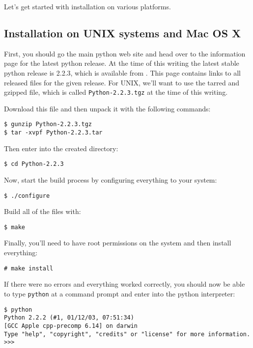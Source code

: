 \documentclass{article}
\begin{document}
Let's get started with installation on various platforms.

\subsection{Installation on UNIX systems and Mac OS X}

First, you should go the main python web site and head over to the information
page for the latest python release. At the time of this writing the
latest stable python release is 2.2.3, which is available from
. This page contains links
to all released files for the given release. For UNIX, we'll want to use
the tarred and gzipped file, which is called \verb|Python-2.2.3.tgz| at
the time of this writing.

Download this file and then unpack it with the following commands:

\begin{verbatim}
$ gunzip Python-2.2.3.tgz 
$ tar -xvpf Python-2.2.3.tar 
\end{verbatim}

Then enter into the created directory:

\begin{verbatim}
$ cd Python-2.2.3
\end{verbatim}

Now, start the build process by configuring everything to your system:

\begin{verbatim}
$ ./configure
\end{verbatim}

Build all of the files with:

\begin{verbatim}
$ make
\end{verbatim}

Finally, you'll need to have root permissions on the system and then
install everything:

\begin{verbatim}
# make install
\end{verbatim}

If there were no errors and everything worked correctly, you should now
be able to type \verb|python| at a command prompt and enter into the
python interpreter:

\begin{verbatim}
$ python
Python 2.2.2 (#1, 01/12/03, 07:51:34) 
[GCC Apple cpp-precomp 6.14] on darwin
Type "help", "copyright", "credits" or "license" for more information.
>>> 
\end{verbatim}
\end{document}
